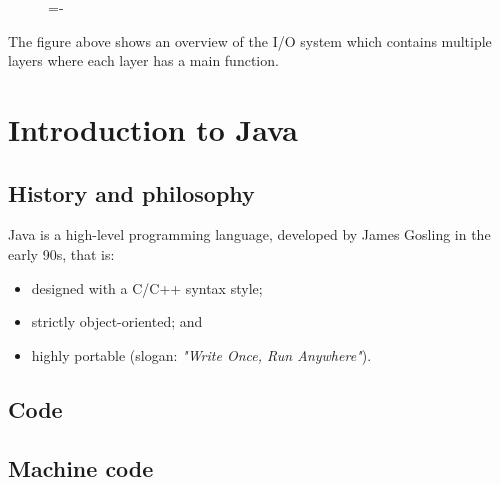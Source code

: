 \documentclass[a4paper]{systems-software}
\begin{document}
\begin{figure}[H]
  \lineskip=-\fboxrule
\end{figure}

The figure above shows an overview of the I/O system which contains multiple layers where each layer has a main function.


\chapter{Introduction to Java}

\section{History and philosophy}

Java is a high-level programming language, developed by James Gosling in the early 90s, that is:
\begin{itemize}
	\item designed with a C/C++ syntax style;
	\item strictly object-oriented; and
	\item highly portable (slogan: \textit{"Write Once, Run Anywhere"}).
\end{itemize}


\section{Code}

\section*{Machine code}
\end{document}
